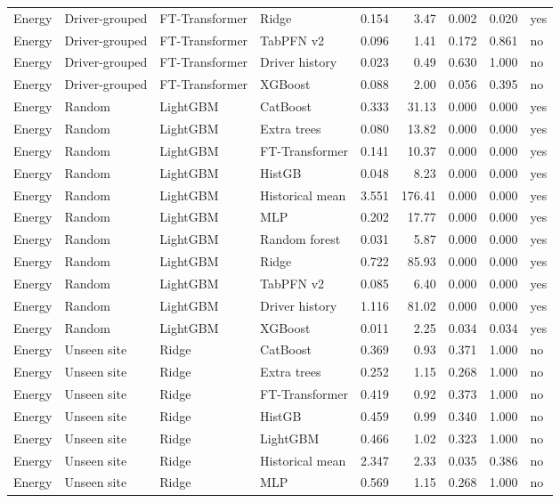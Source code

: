 {\begin{longtable}{llllrrrrl}
Energy & Driver-grouped & FT-Transformer & Ridge & 0.154 & 3.47 & 0.002 & 0.020 & yes \\
Energy & Driver-grouped & FT-Transformer & TabPFN v2 & 0.096 & 1.41 & 0.172 & 0.861 & no \\
Energy & Driver-grouped & FT-Transformer & Driver history & 0.023 & 0.49 & 0.630 & 1.000 & no \\
Energy & Driver-grouped & FT-Transformer & XGBoost & 0.088 & 2.00 & 0.056 & 0.395 & no \\
Energy & Random & LightGBM & CatBoost & 0.333 & 31.13 & 0.000 & 0.000 & yes \\
Energy & Random & LightGBM & Extra trees & 0.080 & 13.82 & 0.000 & 0.000 & yes \\
Energy & Random & LightGBM & FT-Transformer & 0.141 & 10.37 & 0.000 & 0.000 & yes \\
Energy & Random & LightGBM & HistGB & 0.048 & 8.23 & 0.000 & 0.000 & yes \\
Energy & Random & LightGBM & Historical mean & 3.551 & 176.41 & 0.000 & 0.000 & yes \\
Energy & Random & LightGBM & MLP & 0.202 & 17.77 & 0.000 & 0.000 & yes \\
Energy & Random & LightGBM & Random forest & 0.031 & 5.87 & 0.000 & 0.000 & yes \\
Energy & Random & LightGBM & Ridge & 0.722 & 85.93 & 0.000 & 0.000 & yes \\
Energy & Random & LightGBM & TabPFN v2 & 0.085 & 6.40 & 0.000 & 0.000 & yes \\
Energy & Random & LightGBM & Driver history & 1.116 & 81.02 & 0.000 & 0.000 & yes \\
Energy & Random & LightGBM & XGBoost & 0.011 & 2.25 & 0.034 & 0.034 & yes \\
Energy & Unseen site & Ridge & CatBoost & 0.369 & 0.93 & 0.371 & 1.000 & no \\
Energy & Unseen site & Ridge & Extra trees & 0.252 & 1.15 & 0.268 & 1.000 & no \\
Energy & Unseen site & Ridge & FT-Transformer & 0.419 & 0.92 & 0.373 & 1.000 & no \\
Energy & Unseen site & Ridge & HistGB & 0.459 & 0.99 & 0.340 & 1.000 & no \\
Energy & Unseen site & Ridge & LightGBM & 0.466 & 1.02 & 0.323 & 1.000 & no \\
Energy & Unseen site & Ridge & Historical mean & 2.347 & 2.33 & 0.035 & 0.386 & no \\
Energy & Unseen site & Ridge & MLP & 0.569 & 1.15 & 0.268 & 1.000 & no \\

\end{longtable}}
